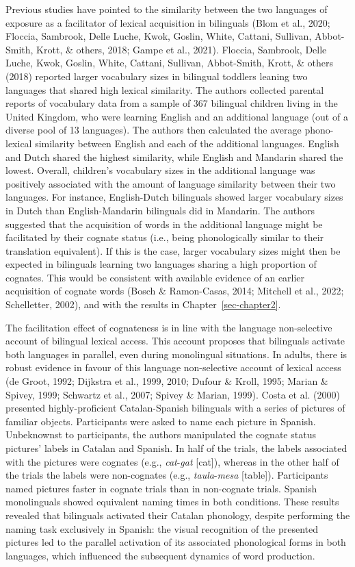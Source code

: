 \documentclass[
  12pt,
  b5paperpaper,
  twoside]{scrreprt}
\begin{document}
Previous studies have pointed to the similarity between the two
languages of exposure as a facilitator of lexical acquisition in
bilinguals (Blom et al., 2020; Floccia, Sambrook, Delle Luche, Kwok,
Goslin, White, Cattani, Sullivan, Abbot-Smith, Krott, \& others, 2018;
Gampe et al., 2021). Floccia, Sambrook, Delle Luche, Kwok, Goslin,
White, Cattani, Sullivan, Abbot-Smith, Krott, \& others (2018) reported
larger vocabulary sizes in bilingual toddlers leaning two languages that
shared high lexical similarity. The authors collected parental reports
of vocabulary data from a sample of 367 bilingual children living in the
United Kingdom, who were learning English and an additional language
(out of a diverse pool of 13 languages). The authors then calculated the
average phono-lexical similarity between English and each of the
additional languages. English and Dutch shared the highest similarity,
while English and Mandarin shared the lowest. Overall, children's
vocabulary sizes in the additional language was positively associated
with the amount of language similarity between their two languages. For
instance, English-Dutch bilinguals showed larger vocabulary sizes in
Dutch than English-Mandarin bilinguals did in Mandarin. The authors
suggested that the acquisition of words in the additional language might
be facilitated by their cognate status (i.e., being phonologically
similar to their translation equivalent). If this is the case, larger
vocabulary sizes might then be expected in bilinguals learning two
languages sharing a high proportion of cognates. This would be
consistent with available evidence of an earlier acquisition of cognate
words (Bosch \& Ramon-Casas, 2014; Mitchell et al., 2022; Schelletter,
2002), and with the results in Chapter~\ref{sec-chapter2}.

The facilitation effect of cognateness is in line with the language
non-selective account of bilingual lexical access. This account proposes
that bilinguals activate both languages in parallel, even during
monolingual situations. In adults, there is robust evidence in favour of
this language non-selective account of lexical access (de Groot, 1992;
Dijkstra et al., 1999, 2010; Dufour \& Kroll, 1995; Marian \& Spivey,
1999; Schwartz et al., 2007; Spivey \& Marian, 1999). Costa et al.
(2000) presented highly-proficient Catalan-Spanish bilinguals with a
series of pictures of familiar objects. Participants were asked to name
each picture in Spanish. Unbeknownst to participants, the authors
manipulated the cognate status pictures' labels in Catalan and Spanish.
In half of the trials, the labels associated with the pictures were
cognates (e.g., \emph{cat}-\emph{gat} {[}cat{]}), whereas in the other
half of the trials the labels were non-cognates (e.g.,
\emph{taula}-\emph{mesa} {[}table{]}). Participants named pictures
faster in cognate trials than in non-cognate trials. Spanish
monolinguals showed equivalent naming times in both conditions. These
results revealed that bilinguals activated their Catalan phonology,
despite performing the naming task exclusively in Spanish: the visual
recognition of the presented pictures led to the parallel activation of
its associated phonological forms in both languages, which influenced
the subsequent dynamics of word production.
\end{document}
